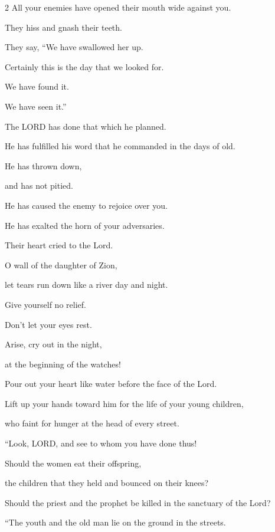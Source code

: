 \begin{multicols}{2}
	\myverse{}All your enemies have opened their mouth wide against you.
	
	They hiss and gnash their teeth.
	
	They say, “We have swallowed her up.
	
	Certainly this is the day that we looked for.
	
	We have found it.
	
	We have seen it.”
	\vspace{\baselineskip}
	
	\myverse{}The LORD has done that which he planned.
	
	He has fulfilled his word that he commanded in the days of old.
	
	He has thrown down,
	
	and has not pitied.
	
	He has caused the enemy to rejoice over you.
	
	He has exalted the horn of your adversaries.
	\vspace{\baselineskip}
	
	\myverse{}Their heart cried to the Lord.
	
	O wall of the daughter of Zion,
	
	let tears run down like a river day and night.
	
	Give yourself no relief.
	
	Don’t let your eyes rest.
	\vspace{\baselineskip}
	
	\myverse{}Arise, cry out in the night,
	
	at the beginning of the watches!
	
	Pour out your heart like water before the face of the Lord.
	
	Lift up your hands toward him for the life of your young children,
	
	who faint for hunger at the head of every street.
	\vspace{\baselineskip}
	
	\myverse{}“Look, LORD, and see to whom you have done thus!
	
	Should the women eat their offspring,
	
	the children that they held and bounced on their knees?
	
	Should the priest and the prophet be killed in the sanctuary of the Lord?
	\vspace{\baselineskip}
	
	\myverse{}“The youth and the old man lie on the ground in the streets.
	

\end{multicols}
